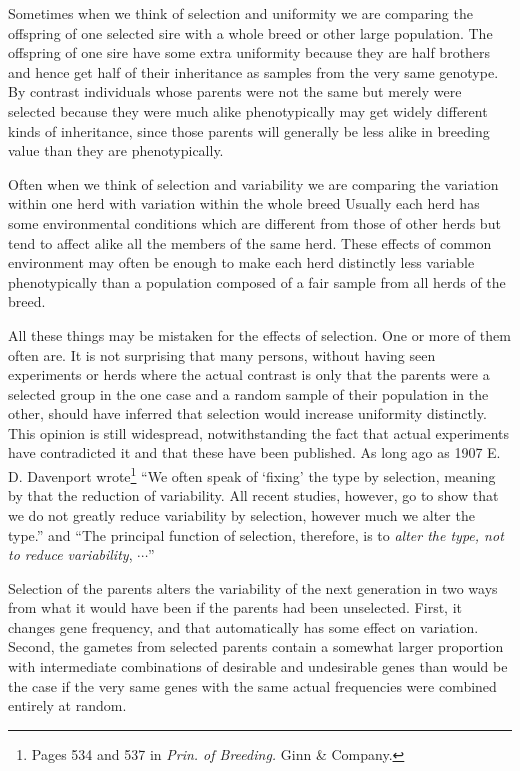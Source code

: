 Sometimes when we think of selection and uniformity we are comparing
the offspring of one selected sire with a whole breed or other
large population. The offspring of one sire have some extra uniformity
because they are half brothers and hence get half of their inheritance as
samples from the very same genotype. By contrast individuals whose
parents were not the same but merely were selected because they were
much alike phenotypically may get widely different kinds of inheritance,
since those parents will generally be less alike in breeding value
than they are phenotypically.

Often when we think of selection and variability we are comparing
the variation within one herd with variation within the whole breed
Usually each herd has some environmental conditions which are different
from those of other herds but tend to affect alike all the members of
the same herd. These effects of common environment may often be
enough to make each herd distinctly less variable phenotypically than a
population composed of a fair sample from all herds of the breed.

All these things may be mistaken for the effects of selection. One
or more of them often are. It is not surprising that many persons, without
having seen experiments or herds where the actual contrast is only
that the parents were a selected group in the one case and a random
sample of their population in the other, should have inferred that selection
would increase uniformity distinctly. This opinion is still widespread,
notwithstanding the fact that actual experiments have
contradicted it and that these have been published. As long ago as 1907
E. D. Davenport wrote\footnote{Pages 534 and 537 in \textit{Prin. of Breeding.}
Ginn \& Company.} ``We often speak of `fixing' the type by selection,
meaning by that the reduction of variability. All recent studies,
however, go to show that we do not greatly reduce variability by selection,
however much we alter the type.'' and ``The principal function of
selection, therefore, is to \textit{alter the type, not to reduce variability},
$\cdots$''

Selection of the parents alters the variability of the next generation
in two ways from what it would have been if the parents had been
unselected. First, it changes gene frequency, and that automatically has
some effect on variation. Second, the gametes from selected parents
contain a somewhat larger proportion with intermediate combinations
of desirable and undesirable genes than would be the case if the very
same genes with the same actual frequencies were combined entirely at
random.

